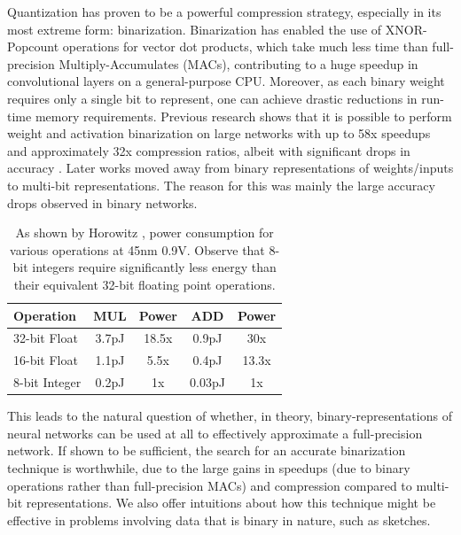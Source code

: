 \noindent Quantization has proven to be a powerful compression strategy, especially in its most extreme form: binarization. Binarization has enabled the use of XNOR-Popcount operations for vector dot products, which take much less time than full-precision Multiply-Accumulates (MACs), contributing to a huge speedup in convolutional layers \cite{rastegari2016xnor,courbariaux2016binarized} on a general-purpose CPU. Moreover, as each binary weight requires only a single bit to represent, one can achieve drastic reductions in run-time memory requirements. Previous research \cite{rastegari2016xnor,courbariaux2016binarized} shows that it is possible to perform weight and activation binarization on large networks with up to 58x speedups and approximately 32x compression ratios, albeit with significant drops in accuracy \cite{rastegari2016xnor}. Later works moved away from binary representations of weights/inputs to multi-bit representations. The reason for this was mainly the large accuracy drops observed in binary networks. \\
\begin{table}[t]
\begin{center}
\begin{tabular}{|l|c|c|c|c|}
\hline
{\bf Operation} & {\bf MUL} & {\bf Power} & {\bf ADD} & {\bf Power}\\ 
\hline
32-bit Float & 3.7pJ & 18.5x & 0.9pJ & 30x \\
16-bit Float & 1.1pJ & 5.5x & 0.4pJ &  13.3x\\
8-bit Integer & 0.2pJ & 1x & 0.03pJ & 1x \\
\hline
\end{tabular}
\end{center}
\caption{As shown by Horowitz \etal\cite{horowitz2014power}, power consumption for various operations at 45nm 0.9V. Observe that 8-bit integers require significantly less energy than their equivalent 32-bit floating point operations.}
\label{table:mac-energy}
\end{table}

 
\noindent  This leads to the natural question of whether, in theory, binary-representations of neural networks can be used at all to effectively approximate a full-precision network. If shown to be sufficient, the search for an accurate binarization technique is worthwhile, due to the large gains in speedups (due to binary operations rather than full-precision MACs) and compression compared to multi-bit representations. We also offer intuitions about how this technique might be effective in problems involving data that is binary in nature, such as sketches.\\ 
 
